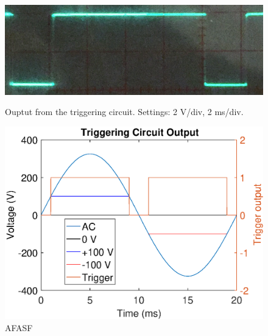 	\begin{figure}[!tbp]
	  \centering
	  \begin{minipage}[b]{0.39\textwidth}
	    \includegraphics[width=\textwidth]{chapters/hardware-chapters/triggering-circuit-output-cropped.png}
		\caption{Ouptut from the triggering circuit. Settings: 2 V/div, 2 ms/div.}
		\label{fig:triggering-circuit-output}
	  \end{minipage}
	  \hfill
	  \begin{minipage}[b]{0.49\textwidth}
	    \includegraphics[width=\textwidth]{chapters/hardware-chapters/ac-wave-triggering.eps}
		\caption{AFASF}
		\label{fig:triggering-circuit-output-2}
	  \end{minipage}
	\end{figure}
	



